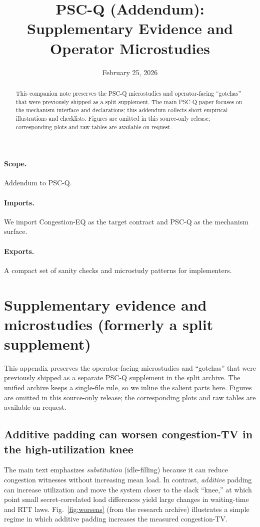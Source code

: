\documentclass[11pt]{article}
\title{PSC-Q (Addendum):\\Supplementary Evidence and Operator Microstudies}
\author{}
\date{February 25, 2026}
\theoremstyle{definition}
\theoremstyle{remark}
\begin{document}
\maketitle

\begin{abstract}
This companion note preserves the PSC-Q microstudies and operator-facing ``gotchas'' that were previously shipped as a split supplement.
The main PSC-Q paper focuses on the mechanism interface and declarations; this addendum collects short empirical illustrations and checklists.
Figures are omitted in this source-only release; corresponding plots and raw tables are available on request.\cite{series:artifactpolicy}
\end{abstract}

\paragraph{Scope.}
Addendum to PSC-Q.\cite{series:pscq}

\paragraph{Imports.}
We import Congestion-EQ as the target contract and PSC-Q as the mechanism surface.\cite{series:congeq,series:pscq}

\paragraph{Exports.}
A compact set of sanity checks and microstudy patterns for implementers.

\section{Supplementary evidence and microstudies (formerly a split supplement)}\label{app:microstudies}
This appendix preserves the operator-facing microstudies and ``gotchas'' that were previously shipped as a separate
PSC-Q supplement in the split archive. The unified archive keeps a single-file rule, so we inline the salient parts here.
Figures are omitted in this source-only release; the corresponding plots and raw tables are available on request.

\subsection{Additive padding can worsen congestion-TV in the high-utilization knee}
The main text emphasizes \emph{substitution} (idle-filling) because it can reduce congestion witnesses without increasing mean load.
In contrast, \emph{additive} padding can increase utilization and move the system closer to the slack ``knee,''
at which point small secret-correlated load differences yield large changes in waiting-time and RTT laws.
Fig.~\ref{fig:worsens} (from the research archive) illustrates a simple regime in which additive padding increases the measured congestion-TV.
\end{document}
